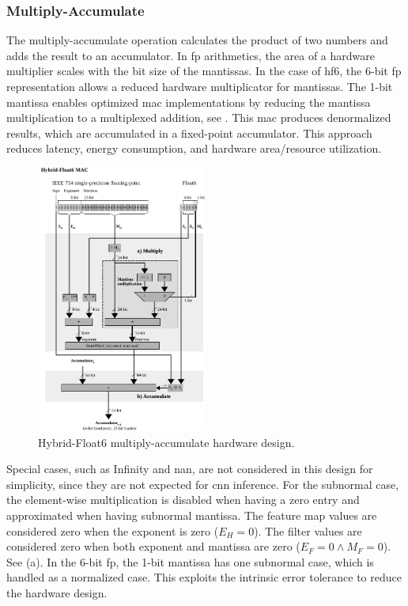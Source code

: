 \subsubsection{Multiply-Accumulate}
The multiply-accumulate operation calculates the product of two numbers and adds the result to an accumulator. In \gls{fp} arithmetics, the area of a hardware multiplier scales with the bit size of the mantissas. In the case of \gls{hf6}, the 6-bit \gls{fp} representation allows a reduced hardware multiplicator for mantissas. The 1-bit mantissa enables optimized \gls{mac} implementations by reducing the mantissa multiplication to a multiplexed addition, see . This \gls{mac} produces denormalized results, which are accumulated in a fixed-point accumulator. This approach reduces latency, energy consumption, and hardware area/resource utilization.

\begin{figure}[t!]
	\centering
	\includegraphics[width=0.5\textwidth]{./chapters/cnn_accelerator/figures/multiplier.pdf}
	\caption{Hybrid-Float6 multiply-accumulate hardware design.}
	\label{fig:multiplier}
\end{figure}

Special cases, such as Infinity and \gls{nan}, are not considered in this design for simplicity, since they are not expected for \gls{cnn} inference. For the subnormal case, the element-wise multiplication is disabled when having a zero entry and approximated when having subnormal mantissa. The feature map values are considered zero when the exponent is zero ($E_H=0$). The filter values are considered zero when both exponent and mantissa are zero ($E_F=0\land M_F=0$). See (a). In the 6-bit \gls{fp}, the 1-bit mantissa has one subnormal case, which is handled as a normalized case. This exploits the intrinsic error tolerance to reduce the hardware design.

